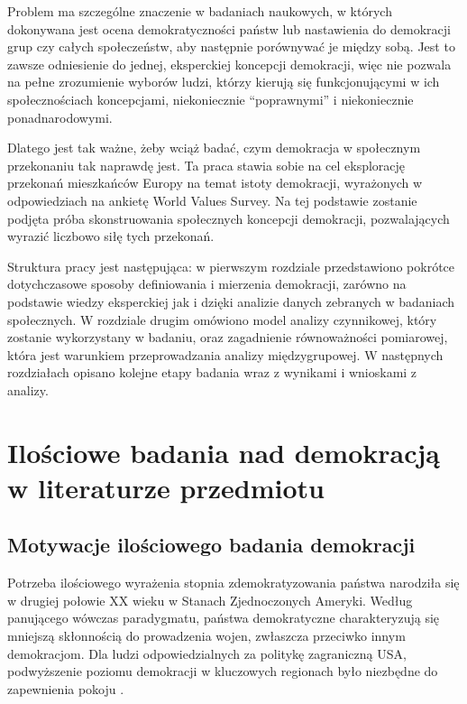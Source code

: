 \documentclass[12pt]{article}
\begin{document}
Problem ma szczególne znaczenie w badaniach naukowych, w których dokonywana jest ocena demokratyczności państw lub nastawienia do demokracji grup czy całych społeczeństw, aby następnie porównywać je między sobą. Jest to zawsze odniesienie do jednej, eksperckiej koncepcji demokracji, więc nie pozwala na pełne zrozumienie wyborów ludzi, którzy kierują się funkcjonującymi w ich społecznościach koncepcjami, niekoniecznie ``poprawnymi'' i niekoniecznie ponadnarodowymi.

Dlatego jest tak ważne, żeby wciąż badać, czym demokracja w społecznym przekonaniu tak naprawdę jest. Ta praca stawia sobie na cel eksplorację przekonań mieszkańców Europy na temat istoty demokracji, wyrażonych w odpowiedziach na ankietę World Values Survey. Na tej podstawie zostanie podjęta próba skonstruowania społecznych koncepcji demokracji, pozwalających wyrazić liczbowo siłę tych przekonań.

Struktura pracy jest następująca: w pierwszym rozdziale przedstawiono pokrótce dotychczasowe sposoby definiowania i mierzenia demokracji, zarówno na podstawie wiedzy eksperckiej jak i dzięki analizie danych zebranych w badaniach społecznych. W rozdziale drugim omówiono model analizy czynnikowej, który zostanie wykorzystany w badaniu, oraz zagadnienie równoważności pomiarowej, która jest warunkiem przeprowadzania analizy międzygrupowej. W następnych rozdziałach opisano kolejne etapy badania wraz z wynikami i wnioskami z analizy.

\hypertarget{iloux15bciowe-badania-nad-demokracjux105-w-literaturze-przedmiotu}{%
\section{Ilościowe badania nad demokracją w literaturze przedmiotu}\label{iloux15bciowe-badania-nad-demokracjux105-w-literaturze-przedmiotu}}

\hypertarget{motywacje-iloux15bciowego-badania-demokracji}{%
\subsection{Motywacje ilościowego badania demokracji}\label{motywacje-iloux15bciowego-badania-demokracji}}

Potrzeba ilościowego wyrażenia stopnia zdemokratyzowania państwa narodziła się w drugiej połowie XX wieku w Stanach Zjednoczonych Ameryki. Według panującego wówczas paradygmatu, państwa demokratyczne charakteryzują się mniejszą skłonnością do prowadzenia wojen, zwłaszcza przeciwko innym demokracjom. Dla ludzi odpowiedzialnych za politykę zagraniczną USA, podwyższenie poziomu demokracji w kluczowych regionach było niezbędne do zapewnienia pokoju \citep{Doorenspleet}.
\end{document}
